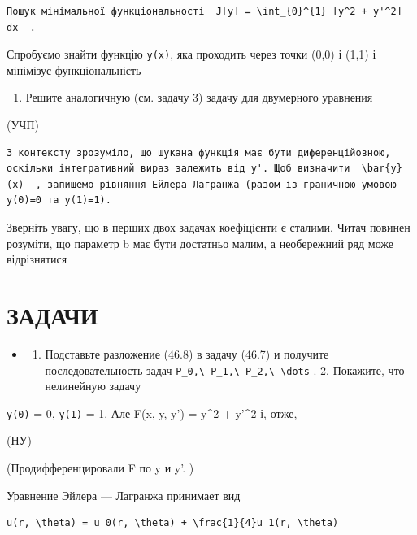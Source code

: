 \documentclass[
  ukrainian,
]{article}
\providecommand{\tightlist}{%
  \setlength{\itemsep}{0pt}\setlength{\parskip}{0pt}}
\begin{document}
\begin{verbatim}
Пошук мінімальної функціональності  J[y] = \int_{0}^{1} [y^2 + y'^2] dx  .
\end{verbatim}

Спробуємо знайти функцію \texttt{y(x)}, яка проходить через точки (0,0)
і (1,1) і мінімізує функціональність

\begin{enumerate}
\def\labelenumi{\arabic{enumi}.}
\setcounter{enumi}{3}
\tightlist
\item
  Решите аналогичную (см. задачу 3) задачу для двумерного уравнения
\end{enumerate}

(УЧП)

\begin{verbatim}
З контексту зрозуміло, що шукана функція має бути диференційовною, оскільки інтегративний вираз залежить від y'. Щоб визначити  \bar{y}(x)  , запишемо рівняння Ейлера–Лагранжа (разом із граничною умовою y(0)=0 та y(1)=1).
\end{verbatim}

Зверніть увагу, що в перших двох задачах коефіцієнти є сталими. Читач
повинен розуміти, що параметр b має бути достатньо малим, а необережний
ряд може відрізнятися

\section{ЗАДАЧИ}\label{ux437ux430ux434ux430ux447ux438-10}

\begin{itemize}
\tightlist
\item
  \begin{enumerate}
  \def\labelenumi{\arabic{enumi}.}
  \tightlist
  \item
    Подставьте разложение (46.8) в задачу (46.7) и получите
    последовательность задач
    \texttt{P\_0,\textbackslash{}\ P\_1,\textbackslash{}\ P\_2,\textbackslash{}\ \textbackslash{}dots}
    . 2. Покажите, что нелинейную задачу
  \end{enumerate}
\end{itemize}

\texttt{y(0)} = 0, \texttt{y(1)} = 1. Але F(x, y, y') = y\^{}2 + y'\^{}2
і, отже,

(НУ)

(Продифференцировали F по y и y'. )

Уравнение Эйлера --- Лагранжа принимает вид

\begin{verbatim}
u(r, \theta) = u_0(r, \theta) + \frac{1}{4}u_1(r, \theta)
\end{verbatim}
\end{document}
